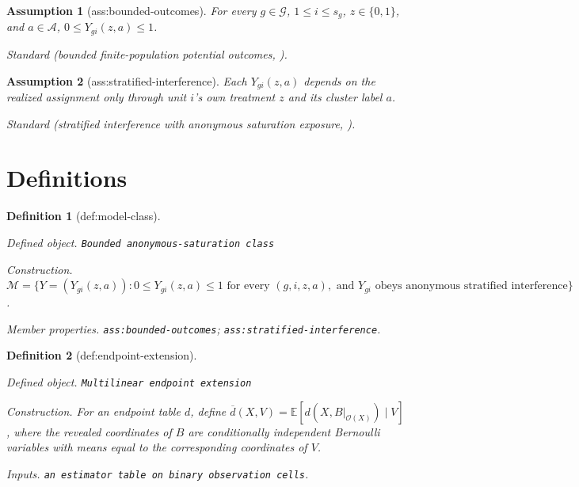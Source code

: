 \documentclass{article}
\newtheorem{assumption}{Assumption}
\newtheorem{definition}{Definition}
\begin{document}
\begin{assumption}[ass:bounded-outcomes]\label{ass:bounded-outcomes}
For every \(g\in\mathcal G\), \(1\le i\le s_g\), \(z\in\{0,1\}\), and \(a\in\mathcal A\), \(0\le Y_{g i}(z,a)\le1\).
\par\smallskip\noindent\emph{Standard} (bounded finite-population potential outcomes, \cite{Hull2026}).
\end{assumption}

\begin{assumption}[ass:stratified-interference]\label{ass:stratified-interference}
Each \(Y_{g i}(z,a)\) depends on the realized assignment only through unit \(i\)'s own treatment \(z\) and its cluster label \(a\).
\par\smallskip\noindent\emph{Standard} (stratified interference with anonymous saturation exposure, \cite{HudgensHalloran2008}).
\end{assumption}

\section{Definitions}

\begin{definition}[def:model-class]\label{def:model-class}
\par\smallskip\noindent\emph{Defined object.} \texttt{Bounded anonymous-\allowbreak{}saturation class}
\par\smallskip\noindent\emph{Construction.} \(\mathcal M=\{Y=(Y_{g i}(z,a)): 0\le Y_{g i}(z,a)\le1\text{ for every }(g,i,z,a),\text{ and }Y_{g i}\text{ obeys anonymous stratified interference}\}\).
\par\smallskip\noindent\emph{Member properties.} \texttt{ass:\allowbreak{}bounded-\allowbreak{}outcomes}; \texttt{ass:\allowbreak{}stratified-\allowbreak{}interference}.
\end{definition}

\begin{definition}[def:endpoint-extension]\label{def:endpoint-extension}
\par\smallskip\noindent\emph{Defined object.} \texttt{Multilinear endpoint extension}
\par\smallskip\noindent\emph{Construction.} For an endpoint table \(d\), define \(\overline d(X,V)=\mathbb E[d(X,B|_{\mathcal O(X)})\mid V]\), where the revealed coordinates of \(B\) are conditionally independent Bernoulli variables with means equal to the corresponding coordinates of \(V\).
\par\smallskip\noindent\emph{Inputs.} \texttt{an estimator table on binary observation cells}.
\end{definition}
\end{document}
